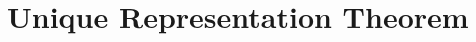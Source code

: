 \documentclass[10pt,letterpaper]{article}
\begin{document}

\section{Unique Representation Theorem}
\label{sec:unique}
\end{document}
